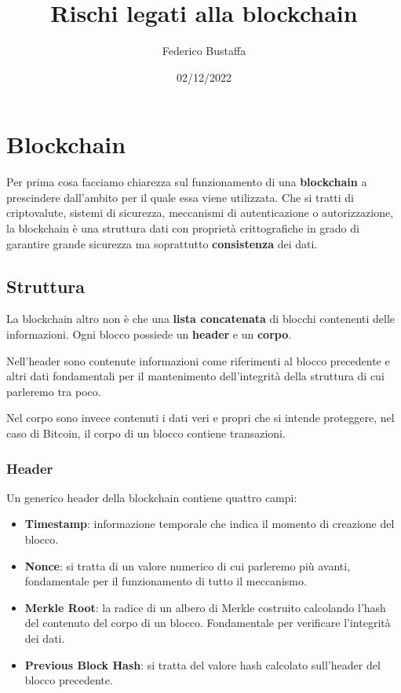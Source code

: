 \documentclass[11pt, a4paper]{article}
\title{Rischi legati alla blockchain}
\author{Federico Bustaffa}
\date{02/12/2022}
\begin{document}
\maketitle
\tableofcontents

\section{Blockchain}
Per prima cosa facciamo chiarezza sul funzionamento di una \textbf{blockchain} a prescindere dall'ambito per il
quale essa viene utilizzata. Che si tratti di criptovalute, sistemi di sicurezza, meccanismi di autenticazione o
autorizzazione, la blockchain è una struttura dati con proprietà crittografiche in grado di garantire grande
sicurezza ma soprattutto \textbf{consistenza} dei dati.

\subsection{Struttura}
La blockchain altro non è che una \textbf{lista concatenata} di blocchi contenenti delle informazioni. Ogni blocco
possiede un \textbf{header} e un \textbf{corpo}.

Nell'header sono contenute informazioni come riferimenti al blocco precedente e altri dati fondamentali per
il mantenimento dell'integrità della struttura di cui parleremo tra poco.

Nel corpo sono invece contenuti i dati veri e propri che si intende proteggere, nel caso di Bitcoin, il corpo di
un blocco contiene transazioni.

\subsubsection{Header}
Un generico header della blockchain contiene quattro campi:
\begin{itemize}
	\item \textbf{Timestamp}: informazione temporale che indica il momento di creazione del blocco.
	\item \textbf{Nonce}: si tratta di un valore numerico di cui parleremo più avanti, fondamentale per il
	      funzionamento di tutto il meccanismo.
	\item \textbf{Merkle Root}: la radice di un albero di Merkle costruito calcolando l'hash del contenuto del corpo
	      di un blocco. Fondamentale per verificare l'integrità dei dati.
	\item \textbf{Previous Block Hash}: si tratta del valore hash calcolato sull'header del blocco precedente.
\end{itemize}
\end{document}
